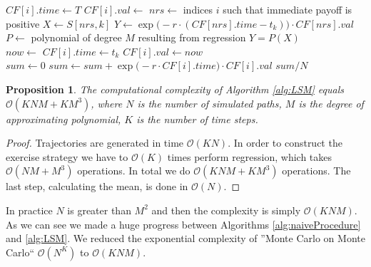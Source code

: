 \documentclass[a4paper,11pt, twoside]{book}
\newtheorem{prop}[thm]{Proposition}
\theoremstyle{definition}
\theoremstyle{remark}
\begin{document}
\begin{algorithm}[!ht]
 \begin{algorithmic}[1]
      \State $CF[i].time \gets T$
      \State $CF[i].val \gets $ 
    \EndFor
      \State $nrs \gets $ indices $i$ such that immediate payoff is positive
      \State $X \gets S[nrs, k]$
      \State $Y \gets \exp\bigl(-r\cdot(CF[nrs].time-t_k) \bigr)\cdot CF[nrs].val$
      \State $P \gets $ polynomial of degree $M$ resulting from regression $Y = P(X)$
      \State {}
    \EndFor
  \EndFunction \\
  
      \State $now \gets$ 
	\State $CF[i].time \gets t_k$ 
	\State $CF[i].val \gets now$ 
      \EndIf
    \EndFor
  \EndFunction \\
  
    \State $sum \gets 0$
      \State $sum \gets sum + \exp\bigl(-r\cdot CF[i].time \bigr) \cdot CF[i].val$
    \EndFor
    \State \Return $sum/N$
  \EndFunction
 \end{algorithmic}
\end{algorithm}
\newpage
\begin{prop}
 The computational complexity of Algorithm \ref{alg:LSM} equals $\mathcal{O}(KNM + KM^3)$, where $N$ is the number of simulated paths, $M$ is the degree of approximating polynomial, $K$ is the number of time steps.
\end{prop}
\begin{proof}
 Trajectories are generated in time $\mathcal{O}(KN)$. In order to construct the exercise strategy we have to $\mathcal{O}(K)$ times perform regression, which takes $\mathcal{O}(NM + M^3)$ operations. In total we do $\mathcal{O}(KNM + KM^3)$ operations. The last step, calculating the mean, is done in $\mathcal{O}(N)$.
\end{proof}

In practice $N$ is greater than $M^2$ and then the complexity is simply $\mathcal{O}(KNM)$. As we can see we made a huge progress between Algorithms \ref{alg:naiveProcedure} and \ref{alg:LSM}. We reduced the exponential complexity of ''Monte Carlo on Monte Carlo`` $\mathcal{O}(N^K)$ to $\mathcal{O}(KNM)$.
\end{document}

